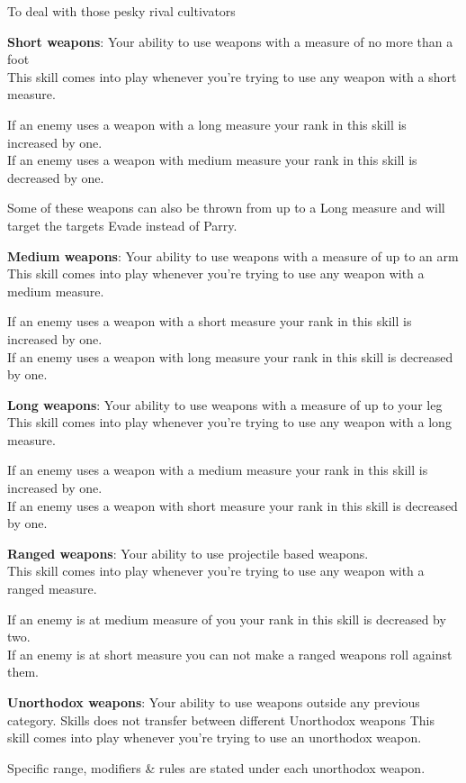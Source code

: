 To deal with those pesky rival cultivators 


\textbf{Short weapons}: Your ability to use weapons with a measure of no more than a foot\\
This skill comes into play whenever you're trying to use any weapon with a short measure. 

If an enemy uses a weapon with a long measure your rank in this skill is increased by one.\\
If an enemy uses a weapon with medium measure your rank in this skill is decreased by one. 

Some of these weapons can also be thrown from up to a Long measure and will target the targets Evade instead of Parry.

\textbf{Medium weapons}: Your ability to use weapons with a measure of up to an arm\\
This skill comes into play whenever you're trying to use any weapon with a medium measure. 

If an enemy uses a weapon with a short measure your rank in this skill is increased by one.\\
If an enemy uses a weapon with long measure your rank in this skill is decreased by one. 

\textbf{Long weapons}: Your ability to use weapons with a measure of up to your leg\\
This skill comes into play whenever you're trying to use any weapon with a long measure.

If an enemy uses a weapon with a medium measure your rank in this skill is increased by one.\\
If an enemy uses a weapon with short measure your rank in this skill is decreased by one. 

\textbf{Ranged weapons}: Your ability to use projectile based weapons. \\
This skill comes into play whenever you're trying to use any weapon with a ranged measure.

If an enemy is at medium measure of you your rank in this skill is decreased by two.\\
If an enemy is at short measure you can not make a ranged weapons roll against them.

\textbf{Unorthodox weapons}: Your ability to use weapons outside any previous category. Skills does not transfer between different Unorthodox weapons
This skill comes into play whenever you're trying to use an unorthodox weapon. 

Specific range, modifiers \& rules are stated under each unorthodox weapon.

